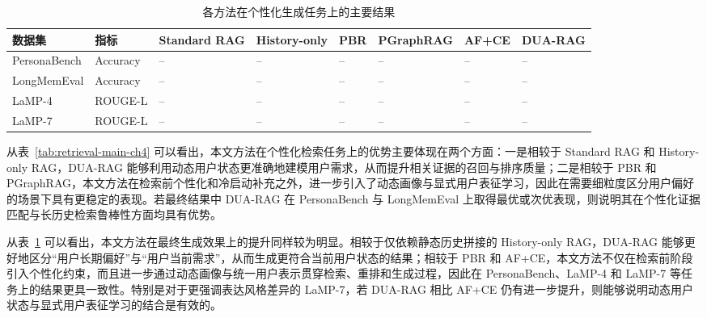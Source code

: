 \begin{table}[htbp]
    \centering
    \caption{各方法在个性化生成任务上的主要结果}
    \label{tab:generation-main-ch4}
    \renewcommand{\arraystretch}{1.15}
    \setlength{\tabcolsep}{4pt}
    \small
    \begin{tabular}{>{\centering\arraybackslash}p{2.3cm}
                    >{\centering\arraybackslash}p{2.4cm}
                    >{\centering\arraybackslash}p{1.7cm}
                    >{\centering\arraybackslash}p{1.7cm}
                    >{\centering\arraybackslash}p{1.4cm}
                    >{\centering\arraybackslash}p{1.6cm}
                    >{\centering\arraybackslash}p{1.3cm}
                    >{\centering\arraybackslash}p{1.5cm}}
        \toprule
        \textbf{数据集} & \textbf{指标} & \textbf{Standard RAG} & \textbf{History-only} & \textbf{PBR} & \textbf{PGraphRAG} & \textbf{AF+CE} & \textbf{DUA-RAG} \\
        \midrule
        PersonaBench & Accuracy & -- & -- & -- & -- & -- & -- \\
        LongMemEval  & Accuracy & -- & -- & -- & -- & -- & -- \\
        LaMP-4       & ROUGE-L  & -- & -- & -- & -- & -- & -- \\
        LaMP-7       & ROUGE-L  & -- & -- & -- & -- & -- & -- \\
        \bottomrule
    \end{tabular}
\end{table}

从表~\ref{tab:retrieval-main-ch4} 可以看出，本文方法在个性化检索任务上的优势主要体现在两个方面：一是相较于 Standard RAG 和 History-only RAG，DUA-RAG 能够利用动态用户状态更准确地建模用户需求，从而提升相关证据的召回与排序质量；二是相较于 PBR 和 PGraphRAG，本文方法在检索前个性化和冷启动补充之外，进一步引入了动态画像与显式用户表征学习，因此在需要细粒度区分用户偏好的场景下具有更稳定的表现。若最终结果中 DUA-RAG 在 PersonaBench 与 LongMemEval 上取得最优或次优表现，则说明其在个性化证据匹配与长历史检索鲁棒性方面均具有优势。

从表~\ref{tab:generation-main-ch4} 可以看出，本文方法在最终生成效果上的提升同样较为明显。相较于仅依赖静态历史拼接的 History-only RAG，DUA-RAG 能够更好地区分“用户长期偏好”与“用户当前需求”，从而生成更符合当前用户状态的结果；相较于 PBR 和 AF+CE，本文方法不仅在检索前阶段引入个性化约束，而且进一步通过动态画像与统一用户表示贯穿检索、重排和生成过程，因此在 PersonaBench、LaMP-4 和 LaMP-7 等任务上的结果更具一致性。特别是对于更强调表达风格差异的 LaMP-7，若 DUA-RAG 相比 AF+CE 仍有进一步提升，则能够说明动态用户状态与显式用户表征学习的结合是有效的。


